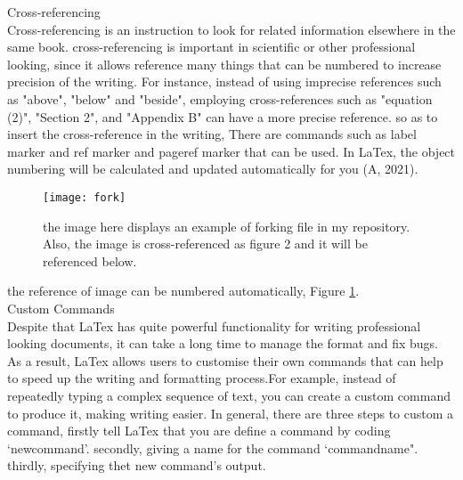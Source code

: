 \documentclass[a4paper, 11pt]{report}
\begin{document}
\noindent Cross-referencing\\
\noindent Cross-referencing is an instruction to look for related information elsewhere in the same book. cross-referencing is important in scientific or other professional looking, since it allows reference many things that can be numbered to increase precision of the writing. For instance, instead of using imprecise references such as "above", "below" and "beside", employing cross-references such as "equation (2)", "Section 2", and "Appendix B" can have a more precise reference. so as to insert the cross-reference in the writing, There are commands such as label marker and ref marker and pageref marker that can be used. In LaTex, the object numbering will be calculated and updated automatically for you (A, 2021). \\

\begin{figure}[h]

\centering

\graphicspath{ {./group-work} }

\texttt{[image: fork]}

\caption{the image here displays an example of forking file in my repository.  Also, the image is cross-referenced as figure 2 and  it will be referenced below. }

\label{fig:leaf}

\end{figure}

\noindent the reference of image can be numbered automatically,  Figure \ref{fig:leaf}.\\

\noindent Custom Commands\\
\noindent Despite that LaTex has quite powerful functionality for writing professional looking documents, it can take a long time to manage the format and fix bugs. As a result, LaTex allows users to customise their own commands that can help to  speed up the writing and formatting process.For example, instead of repeatedly typing a complex sequence of text, you can create a custom command to produce it, making writing easier. In general, there are three steps to custom a command, firstly tell LaTex that you are define a command by coding ‘newcommand’.  secondly, giving a name for the command ‘commandname". thirdly, specifying thet new command’s output.\\

\newcommand{\todo}[1] {\textbf{\textcolor{red}{#1}}}
\end{document}
